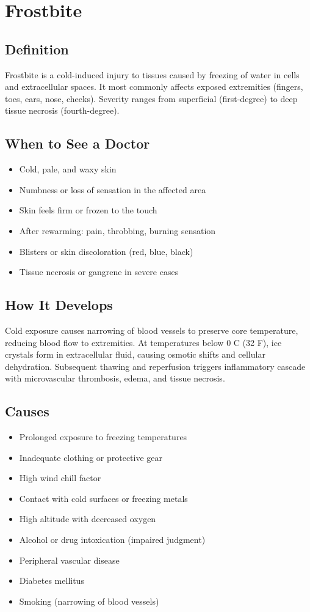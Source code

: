 \chapter{Frostbite}

\section*{Definition}
Frostbite is a cold-induced injury to tissues caused by freezing of water in cells and extracellular spaces. It most commonly affects exposed extremities (fingers, toes, ears, nose, cheeks). Severity ranges from superficial (first-degree) to deep tissue necrosis (fourth-degree).

\section*{When to See a Doctor}
\begin{itemize}
\item Cold, pale, and waxy skin
\item Numbness or loss of sensation in the affected area
\item Skin feels firm or frozen to the touch
\item After rewarming: pain, throbbing, burning sensation
\item Blisters or skin discoloration (red, blue, black)
\item Tissue necrosis or gangrene in severe cases
\end{itemize}

\section*{How It Develops}
Cold exposure causes narrowing of blood vessels to preserve core temperature, reducing blood flow to extremities. At temperatures below 0 C (32 F), ice crystals form in extracellular fluid, causing osmotic shifts and cellular dehydration. Subsequent thawing and reperfusion triggers inflammatory cascade with microvascular thrombosis, edema, and tissue necrosis.

\section*{Causes}
\begin{itemize}
\item Prolonged exposure to freezing temperatures
\item Inadequate clothing or protective gear
\item High wind chill factor
\item Contact with cold surfaces or freezing metals
\item High altitude with decreased oxygen
\item Alcohol or drug intoxication (impaired judgment)
\item Peripheral vascular disease
\item Diabetes mellitus
\item Smoking (narrowing of blood vessels)
\end{itemize}

